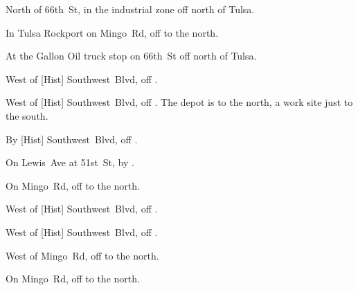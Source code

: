 
\begin{LocationList}

North of 66th~St, in the industrial zone off  north of Tulsa.

In Tulsa Rockport on Mingo~Rd, off  to the north.

At the Gallon Oil truck stop on 66th~St off  north of Tulsa.

\Location{\GarageHQ \Garage}
West of [Hist] Southwest~Blvd, off  .

West of [Hist] Southwest~Blvd, off  .
The depot is to the north, a work site just to the south.

By [Hist] Southwest~Blvd, off  .

On Lewis~Ave at 51st~St, by  .

On Mingo~Rd, off  to the north.

West of [Hist] Southwest~Blvd, off  .

\Location{\TruckService \Service}
West of [Hist] Southwest~Blvd, off  .

West of Mingo~Rd, off  to the north.

On Mingo~Rd, off  to the north.

\end{LocationList}
